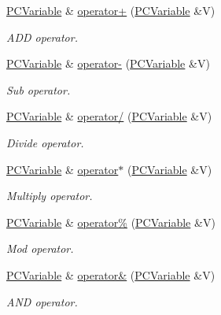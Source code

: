 \begin{DoxyCompactItemize}
\hyperlink{classpc__emulator_1_1PCVariable}{P\+C\+Variable} \& \hyperlink{classpc__emulator_1_1PCVariable_af03de04a15390242d729e37d3b3c847b}{operator+} (\hyperlink{classpc__emulator_1_1PCVariable}{P\+C\+Variable} \&V)
\begin{DoxyCompactList}\small\item\em A\+DD operator. \end{DoxyCompactList}\item 
\hyperlink{classpc__emulator_1_1PCVariable}{P\+C\+Variable} \& \hyperlink{classpc__emulator_1_1PCVariable_af34a81cd0e431cd6112dad1080b01e52}{operator-\/} (\hyperlink{classpc__emulator_1_1PCVariable}{P\+C\+Variable} \&V)
\begin{DoxyCompactList}\small\item\em Sub operator. \end{DoxyCompactList}\item 
\hyperlink{classpc__emulator_1_1PCVariable}{P\+C\+Variable} \& \hyperlink{classpc__emulator_1_1PCVariable_a6b223f5c0b1b13bfe696fc7176a31cb0}{operator/} (\hyperlink{classpc__emulator_1_1PCVariable}{P\+C\+Variable} \&V)
\begin{DoxyCompactList}\small\item\em Divide operator. \end{DoxyCompactList}\item 
\hyperlink{classpc__emulator_1_1PCVariable}{P\+C\+Variable} \& \hyperlink{classpc__emulator_1_1PCVariable_a9ba9f34d85ee4775178433ee04599b29}{operator$\ast$} (\hyperlink{classpc__emulator_1_1PCVariable}{P\+C\+Variable} \&V)
\begin{DoxyCompactList}\small\item\em Multiply operator. \end{DoxyCompactList}\item 
\hyperlink{classpc__emulator_1_1PCVariable}{P\+C\+Variable} \& \hyperlink{classpc__emulator_1_1PCVariable_a776e9a9c8d6fd4b719e533e95bbc0a77}{operator\%} (\hyperlink{classpc__emulator_1_1PCVariable}{P\+C\+Variable} \&V)
\begin{DoxyCompactList}\small\item\em Mod operator. \end{DoxyCompactList}\item 
\hyperlink{classpc__emulator_1_1PCVariable}{P\+C\+Variable} \& \hyperlink{classpc__emulator_1_1PCVariable_a26b66b7599eef8f3e15f14fc897cda50}{operator\&} (\hyperlink{classpc__emulator_1_1PCVariable}{P\+C\+Variable} \&V)
\begin{DoxyCompactList}\small\item\em A\+ND operator. \end{DoxyCompactList}\item 

\end{DoxyCompactItemize}
